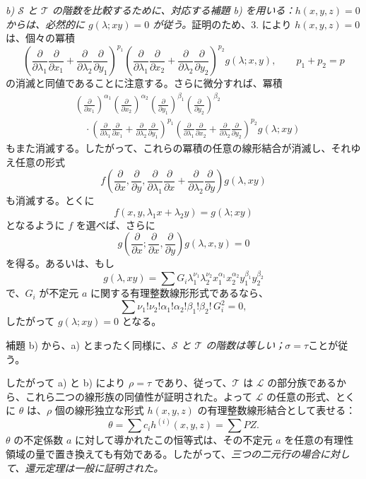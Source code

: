 \emph{b) $\mathcal S$ と $\mathcal T$ の階数を比較するために、対応する補題 b) を用いる：$h(x,y,z)=0$ からは、必然的に $g(\lambda;xy)=0$ が従う。}証明のため、3. により $h(x,y,z)=0$ は、個々の冪積
\[
 \left(\frac{\partial}{\partial\lambda_1}\frac{\partial}{\partial x_1}
 +\frac{\partial}{\partial\lambda_2}\frac{\partial}{\partial y_1}\right)^{p_1}
 \left(\frac{\partial}{\partial\lambda_1}\frac{\partial}{\partial x_2}
 +\frac{\partial}{\partial\lambda_2}\frac{\partial}{\partial y_2}\right)^{p_2}g(\lambda;x,y),
 \qquad p_1+p_2=p
\]
の消滅と同値であることに注意する。さらに微分すれば、冪積
\[
\begin{aligned}
&\left(\frac{\partial}{\partial x_1}\right)^{\alpha_1}
 \left(\frac{\partial}{\partial x_2}\right)^{\alpha_2}
 \left(\frac{\partial}{\partial y_1}\right)^{\beta_1}
 \left(\frac{\partial}{\partial y_2}\right)^{\beta_2} \\
&\quad\cdot
 \left(\frac{\partial}{\partial\lambda_1}\frac{\partial}{\partial x_1}
 +\frac{\partial}{\partial\lambda_2}\frac{\partial}{\partial y_1}\right)^{p_1}
 \left(\frac{\partial}{\partial\lambda_1}\frac{\partial}{\partial x_2}
 +\frac{\partial}{\partial\lambda_2}\frac{\partial}{\partial y_2}\right)^{p_2}
 g(\lambda;xy)
\end{aligned}
\]
もまた消滅する。したがって、これらの冪積の任意の線形結合が消滅し、それゆえ任意の形式
\[
  f\left(\frac{\partial}{\partial x},\frac{\partial}{\partial y},
  \frac{\partial}{\partial\lambda_1}\frac{\partial}{\partial x}
  +\frac{\partial}{\partial\lambda_2}\frac{\partial}{\partial y}\right)g(\lambda,xy)
\]
も消滅する。とくに
\[
  f(x,y,\lambda_1x+\lambda_2y)=g(\lambda;xy)
\]
となるように $f$ を選べば、さらに
\[
  g\left(\frac{\partial}{\partial x};
    \frac{\partial}{\partial x},
    \frac{\partial}{\partial y}\right)g(\lambda,x,y)=0
\]
を得る。あるいは、もし
\[
  g(\lambda,xy)=\sum G_i\lambda_1^{\nu_1}\lambda_2^{\nu_2}
  x_1^{\alpha_1}x_2^{\alpha_2}y_1^{\beta_1}y_2^{\beta_2}
\]
で、$G_i$ が不定元 $a$ に関する有理整数線形形式であるなら、
\[
  \sum \nu_1!\nu_2!\alpha_1!\alpha_2!\beta_1!\beta_2!\,G_i^2=0,
\]
したがって $g(\lambda;xy)=0$ となる。

補題 b) から、a) とまったく同様に、\emph{$\mathcal S$ と $\mathcal T$ の階数は等しい；$\sigma=\tau$}ことが従う。

したがって a) と b) により $\rho=\tau$ であり、従って、$\mathcal T$ は $\mathcal L$ の部分族であるから、これら二つの線形族の同値性が証明された。よって $\mathcal L$ の任意の形式、とくに $\theta$ は、$\rho$ 個の線形独立な形式 $h(x,y,z)$ の有理整数線形結合として表せる：
\[
  \theta=\sum c_i h^{(i)}(x,y,z)=\sum PZ.
\]
$\theta$ の不定係数 $a$ に対して導かれたこの恒等式は、その不定元 $a$ を任意の有理性領域の量で置き換えても有効である。したがって、\emph{三つの二元行の場合に対して、還元定理は一般に証明された。}


